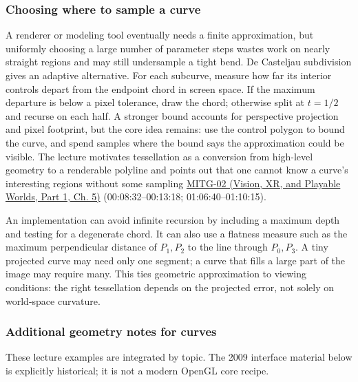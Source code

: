 \subsubsection{Choosing where to sample a curve}\label{03-visual-computing-i-ch001-choosing-where-to-sample-a-curve}

\hypertarget{03-visual-computing-i-ch001-choosing-where-to-sample-a-curve}{}

A renderer or modeling tool eventually needs a finite approximation, but uniformly choosing a large number of parameter steps wastes work on nearly straight regions and may still undersample a tight bend. De Casteljau subdivision gives an adaptive alternative. For each subcurve, measure how far its interior controls depart from the endpoint chord in screen space. If the maximum departure is below a pixel tolerance, draw the chord; otherwise split at \(t=1/2\) and recurse on each half. A stronger bound accounts for perspective projection and pixel footprint, but the core idea remains: use the control polygon to bound the curve, and spend samples where the bound says the approximation could be visible. The lecture motivates tessellation as a conversion from high-level geometry to a renderable polyline and points out that one cannot know a curve's interesting regions without some sampling \href{../07-Vision-XR-and-Playable-Worlds-P01/main.pdf\#04-visual-computing-ii-ch036-mitg-02---cubic-curves}{MITG-02 (Vision, XR, and Playable Worlds, Part 1, Ch. 5)} (00:08:32--00:13:18; 01:06:40--01:10:15).

An implementation can avoid infinite recursion by including a maximum depth and testing for a degenerate chord. It can also use a flatness measure such as the maximum perpendicular distance of \(P_1,P_2\) to the line through \(P_0,P_3\). A tiny projected curve may need only one segment; a curve that fills a large part of the image may require many. This ties geometric approximation to viewing conditions: the right tessellation depends on the projected error, not solely on world-space curvature.

\subsubsection{Additional geometry notes for curves}\label{03-visual-computing-i-ch001-additional-geometry-notes-for-curves}

\hypertarget{03-visual-computing-i-ch001-additional-geometry-notes-for-curves}{}

These lecture examples are integrated by topic. The 2009 interface material below is explicitly historical; it is not a modern OpenGL core recipe.

